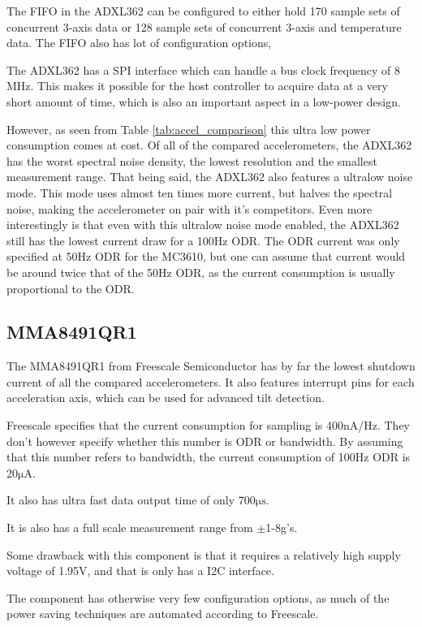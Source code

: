 The FIFO in the ADXL362 can be configured to either hold 170 sample sets of concurrent 3-axis data or 128 sample sets of concurrent 3-axis and temperature data. The FIFO also has lot of configuration options,  

The ADXL362 has a SPI interface which can handle a bus clock frequency of 8 MHz. This makes it possible for the host controller to acquire data at a very short amount of time, which is also an important aspect in a low-power design.

However, as seen from Table \ref{tab:accel_comparison} this ultra low power consumption comes at cost. Of all of the compared accelerometers, the ADXL362 has the worst spectral noise density, the lowest resolution and the smallest measurement range. That being said, the ADXL362 also features a ultralow noise mode. This mode uses almost ten times more current, but halves the spectral noise, making the accelerometer on pair with it's competitors. Even more interestingly is that even with this ultralow noise mode enabled, the ADXL362 still has the lowest current draw for a 100Hz ODR. The ODR current was only specified at 50Hz ODR for the MC3610, but one can assume that current would be around twice that of the 50Hz ODR, as the current consumption is usually proportional to the ODR.

\subsection{MMA8491QR1}

The MMA8491QR1 from Freescale Semiconductor has by far the lowest shutdown current of all the compared accelerometers. It also features interrupt pins for each acceleration axis, which can be used for advanced tilt detection.

Freescale specifies that the current consumption for sampling is 400nA/Hz. They don't however specify whether this number is ODR or bandwidth. By assuming that this number refers to bandwidth, the current consumption of 100Hz ODR is 20$\si{\micro\ampere}$. 

It also has ultra fast data output time of only 700$\si{\micro\second}$.

It is also has a full scale measurement range from $\pm$1-8g's.

Some drawback with this component is that it requires a relatively high supply voltage of 1.95V, and that is only has a I2C interface.

The component has otherwise very few configuration options, as much of the power saving techniques are automated according to Freescale.

